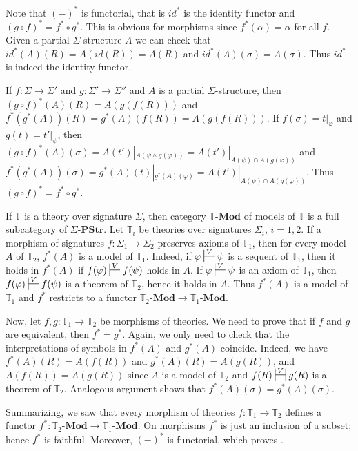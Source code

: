 \documentclass[reqno]{amsart}
\theoremstyle{definition}
\theoremstyle{remark}
\newcommand{\cat}[1]{\mathbf{#1}}
\newcommand{\PStr}[1]{#1\text{-}\cat{PStr}}
\newcommand{\Mod}[1]{#1\text{-}\cat{Mod}}
\numberwithin{figure}{section}
\begin{document}
Note that $(-)^*$ is functorial, that is $id^*$ is the identity functor and $(g \circ f)^* = f^* \circ g^*$.
This is obvious for morphisms since $f^*(\alpha) = \alpha$ for all $f$.
Given a partial $\Sigma$-structure $A$ we can check that $id^*(A)(R) = A(id(R)) = A(R)$ and $id^*(A)(\sigma) = A(\sigma)$.
Thus $id^*$ is indeed the identity functor.

If $f : \Sigma \to \Sigma'$ and $g : \Sigma' \to \Sigma''$ and $A$ is a partial $\Sigma$-structure,
then $(g \circ f)^*(A)(R) = A(g(f(R)))$ and $f^*(g^*(A))(R) = g^*(A)(f(R)) = A(g(f(R)))$.
If $f(\sigma) = t|_\varphi$ and $g(t) = t'|_\psi$, then $(g \circ f)^*(A)(\sigma) = A(t')|_{A(\psi \land g(\varphi))} = A(t')|_{A(\psi) \cap A(g(\varphi))}$
and $f^*(g^*(A))(\sigma) = g^*(A)(t)|_{g^*(A)(\varphi)} = A(t')|_{A(\psi) \cap A(g(\varphi))}$.
Thus $(g \circ f)^* = f^* \circ g^*$.

If $\mathbb{T}$ is a theory over signature $\Sigma$, then category $\Mod{\mathbb{T}}$ of models of $\mathbb{T}$ is a full subcategory of $\PStr{\Sigma}$.
Let $\mathbb{T}_i$ be theories over signatures $\Sigma_i$, $i = 1,2$.
If a morphism of signatures $f : \Sigma_1 \to \Sigma_2$ preserves axioms of $\mathbb{T}_1$, then for every model $A$ of $\mathbb{T}_2$, $f^*(A)$ is a model of $\mathbb{T}_1$.
Indeed, if $\varphi \sststile{}{V} \psi$ is a sequent of $\mathbb{T}_1$, then it holds in $f^*(A)$ if $f(\varphi) \sststile{}{V} f(\psi)$ holds in $A$.
If $\varphi \sststile{}{V} \psi$ is an axiom of $\mathbb{T}_1$, then $f(\varphi) \sststile{}{V} f(\psi)$ is a theorem of $\mathbb{T}_2$, hence it holds in $A$.
Thus $f^*(A)$ is a model of $\mathbb{T}_1$ and $f^*$ restricts to a functor $\Mod{\mathbb{T}_2} \to \Mod{\mathbb{T}_1}$.

Now, let $f,g : \mathbb{T}_1 \to \mathbb{T}_2$ be morphisms of theories.
We need to prove that if $f$ and $g$ are equivalent, then $f^* = g^*$.
Again, we only need to check that the interpretations of symbols in $f^*(A)$ and $g^*(A)$ coincide.
Indeed, we have $f^*(A)(R) = A(f(R))$ and $g^*(A)(R) = A(g(R))$, and $A(f(R)) = A(g(R))$ since $A$ is a model of $\mathbb{T}_2$ and $f(R) \ssststile{}{V} g(R)$ is a theorem of $\mathbb{T}_2$.
Analogous argument shows that $f^*(A)(\sigma) = g^*(A)(\sigma)$.

Summarizing, we saw that every morphism of theories $f : \mathbb{T}_1 \to \mathbb{T}_2$ defines a functor $f^* : \Mod{\mathbb{T}_2} \to \Mod{\mathbb{T}_1}$.
On morphisms $f^*$ is just an inclusion of a subset; hence $f^*$ is faithful.
Moreover, $(-)^*$ is functorial, which proves .
\end{document}
